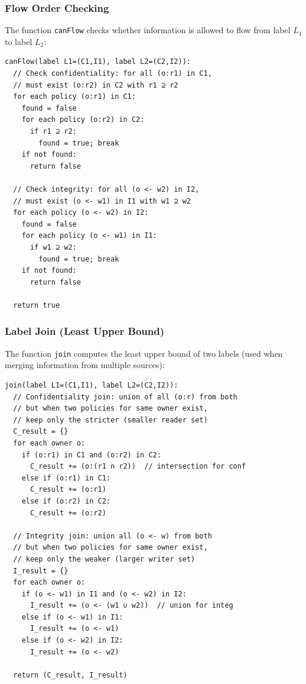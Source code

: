 \subsubsection*{Flow Order Checking}

The function \texttt{canFlow} checks whether information is allowed to flow from label $L_1$ to label $L_2$:

\begin{verbatim}
canFlow(label L1=(C1,I1), label L2=(C2,I2)):
  // Check confidentiality: for all (o:r1) in C1,
  // must exist (o:r2) in C2 with r1 ⊇ r2
  for each policy (o:r1) in C1:
    found = false
    for each policy (o:r2) in C2:
      if r1 ⊇ r2:
        found = true; break
    if not found:
      return false
  
  // Check integrity: for all (o <- w2) in I2,
  // must exist (o <- w1) in I1 with w1 ⊇ w2
  for each policy (o <- w2) in I2:
    found = false
    for each policy (o <- w1) in I1:
      if w1 ⊇ w2:
        found = true; break
    if not found:
      return false
  
  return true
\end{verbatim}

\subsubsection*{Label Join (Least Upper Bound)}

The function \texttt{join} computes the least upper bound of two labels (used when merging information from multiple sources):

\begin{verbatim}
join(label L1=(C1,I1), label L2=(C2,I2)):
  // Confidentiality join: union of all (o:r) from both
  // but when two policies for same owner exist,
  // keep only the stricter (smaller reader set)
  C_result = {}
  for each owner o:
    if (o:r1) in C1 and (o:r2) in C2:
      C_result += (o:(r1 ∩ r2))  // intersection for conf
    else if (o:r1) in C1:
      C_result += (o:r1)
    else if (o:r2) in C2:
      C_result += (o:r2)
  
  // Integrity join: union all (o <- w) from both
  // but when two policies for same owner exist,
  // keep only the weaker (larger writer set)
  I_result = {}
  for each owner o:
    if (o <- w1) in I1 and (o <- w2) in I2:
      I_result += (o <- (w1 ∪ w2))  // union for integ
    else if (o <- w1) in I1:
      I_result += (o <- w1)
    else if (o <- w2) in I2:
      I_result += (o <- w2)
  
  return (C_result, I_result)
\end{verbatim}

